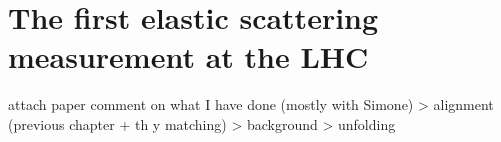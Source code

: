 \chapter[felm]{The first elastic scattering measurement at the LHC}

\> attach paper
\> comment on what I have done (mostly with Simone)
\>> alignment (previous chapter + th y matching)
\>> background
\>> unfolding

